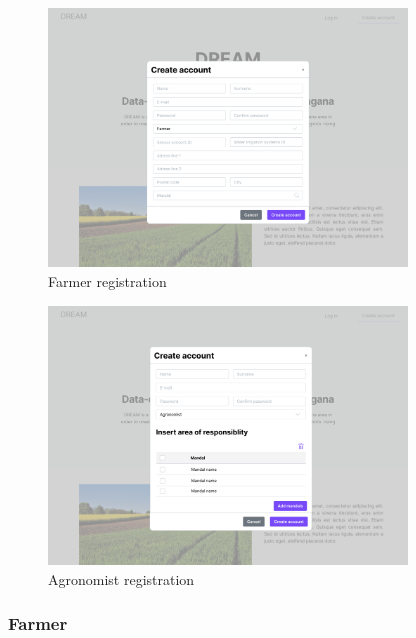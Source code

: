 \begin{figure}[H]
\centering
\includegraphics[width=0.85\textwidth]{mockups/Unreg. user_Create account_Farmer.png}
\caption{Farmer registration}
\end{figure}

\begin{figure}[H]
\centering
\includegraphics[width=0.85\textwidth]{mockups/Unreg. user_Create account_Agronomist.png}
\caption{Agronomist registration}
\end{figure}


\subsubsection{Farmer}


